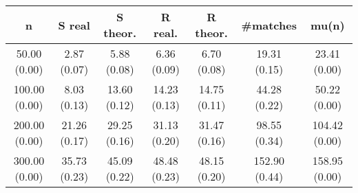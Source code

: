 \begin{center}
\begin{tabular}{c | c | c | c | c | c | c}
n & S real & S theor. & R real. & R theor. & #matches & mu(n)\\ \hline
50.00 (0.00) & 2.87 (0.07) & 5.88 (0.08) & 6.36 (0.09) & 6.70 (0.08) & 19.31 (0.15) & 23.41 (0.00) \\
100.00 (0.00) & 8.03 (0.13) & 13.60 (0.12) & 14.23 (0.13) & 14.75 (0.11) & 44.28 (0.22) & 50.22 (0.00) \\
200.00 (0.00) & 21.26 (0.17) & 29.25 (0.16) & 31.13 (0.20) & 31.47 (0.16) & 98.55 (0.34) & 104.42 (0.00) \\
300.00 (0.00) & 35.73 (0.23) & 45.09 (0.22) & 48.48 (0.23) & 48.15 (0.20) & 152.90 (0.44) & 158.95 (0.00) \\
\end{tabular}
\end{center}

